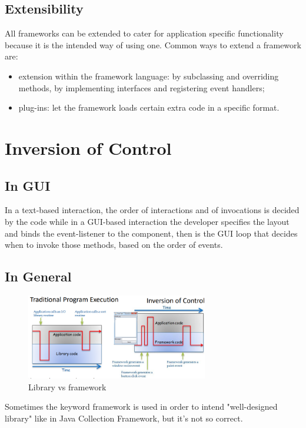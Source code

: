 \subsection{Extensibility}
All frameworks can be extended to cater for application specific functionality because it is the intended way of using one.
Common ways to extend a framework are:
\begin{itemize}
    \item extension within the framework language: by subclassing and overriding methods, by implementing interfaces and registering event handlers;
    \item plug-ins: let the framework loads certain extra code in a specific format.
\end{itemize}

\section{Inversion of Control}

\subsection{In GUI}
In a text-based interaction, the order of interactions and of invocations is decided by the code while in a GUI-based interaction the developer specifies the layout and binds the event-listener to the component, then is the GUI loop that decides when to invoke those methods, based on the order of events.

\subsection{In General}
\begin{figure}[H]
    \centering
    \includegraphics[width=300px]{images/9_Frameworks/IOC.png}
    \caption{Library vs framework}
\end{figure}

Sometimes the keyword framework is used in order to intend "well-designed library" like in Java Collection Framework, but it's not so correct.

